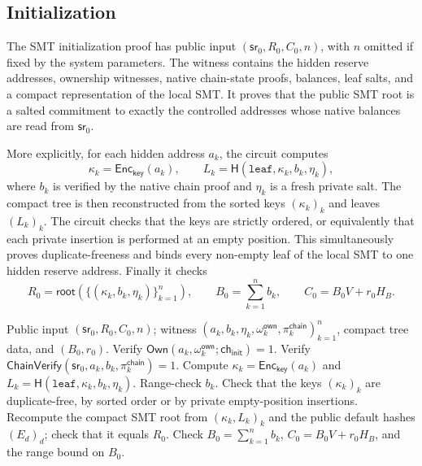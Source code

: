 \documentclass[runningheads]{llncs}
\newcommand{\Enc}{\mathsf{Enc}}
\newcommand{\CRH}{\mathsf{H}}
\newcommand{\sr}{\mathsf{sr}}
\newcommand{\Rel}{\mathcal{R}}
\newcommand{\rootof}{\mathsf{root}}
\begin{document}
\subsection{Initialization}

The SMT initialization proof has public input \((\sr_0,R_0,C_0,n)\), with \(n\) omitted if fixed by the system parameters.  The witness contains the hidden reserve addresses, ownership witnesses, native chain-state proofs, balances, leaf salts, and a compact representation of the local SMT.  It proves that the public SMT root is a salted commitment to exactly the controlled addresses whose native balances are read from \(\sr_0\).

More explicitly, for each hidden address \(a_k\), the circuit computes
\[
        \kappa_k=\Enc_{\mathsf{key}}(a_k),
        \qquad
        L_k=\CRH(\mathtt{leaf},\kappa_k,b_k,\eta_k),
\]
where \(b_k\) is verified by the native chain proof and \(\eta_k\) is a fresh private salt.  The compact tree is then reconstructed from the sorted keys \((\kappa_k)_k\) and leaves \((L_k)_k\).  The circuit checks that the keys are strictly ordered, or equivalently that each private insertion is performed at an empty position.  This simultaneously proves duplicate-freeness and binds every non-empty leaf of the local SMT to one hidden reserve address.  Finally it checks
\[
        R_0=\rootof(\{(\kappa_k,b_k,\eta_k)\}_{k=1}^n),
        \qquad
        B_0=\sum_{k=1}^n b_k,
        \qquad
        C_0=B_0V+r_0H_B .
\]

\begin{algorithm}[H]
\caption{SMT initialization relation \(\Rel_{\mathsf{init}}^{\mathsf{smt}}\)}
\label{alg:smt-init-rel}
\begin{algorithmic}[1]
\Require Public input \((\sr_0,R_0,C_0,n)\); witness \((a_k,b_k,\eta_k,\omega_k^{\mathsf{own}},\pi_k^{\mathsf{chain}})_{k=1}^n\), compact tree data, and \((B_0,r_0)\).
    \State Verify \(\mathsf{Own}(a_k,\omega_k^{\mathsf{own}};\mathsf{ch}_{\mathsf{init}})=1\).
    \State Verify \(\mathsf{ChainVerify}(\sr_0,a_k,b_k,\pi_k^{\mathsf{chain}})=1\).
    \State Compute \(\kappa_k=\Enc_{\mathsf{key}}(a_k)\) and \(L_k=\CRH(\mathtt{leaf},\kappa_k,b_k,\eta_k)\).
    \State Range-check \(b_k\).
\EndFor
\State Check that the keys \((\kappa_k)_k\) are duplicate-free, by sorted order or by private empty-position insertions.
\State Recompute the compact SMT root from \((\kappa_k,L_k)_k\) and the public default hashes \((E_d)_d\); check that it equals \(R_0\).
\State Check \(B_0=\sum_{k=1}^nb_k\), \(C_0=B_0V+r_0H_B\), and the range bound on \(B_0\).
\end{algorithmic}
\end{algorithm}
\end{document}
